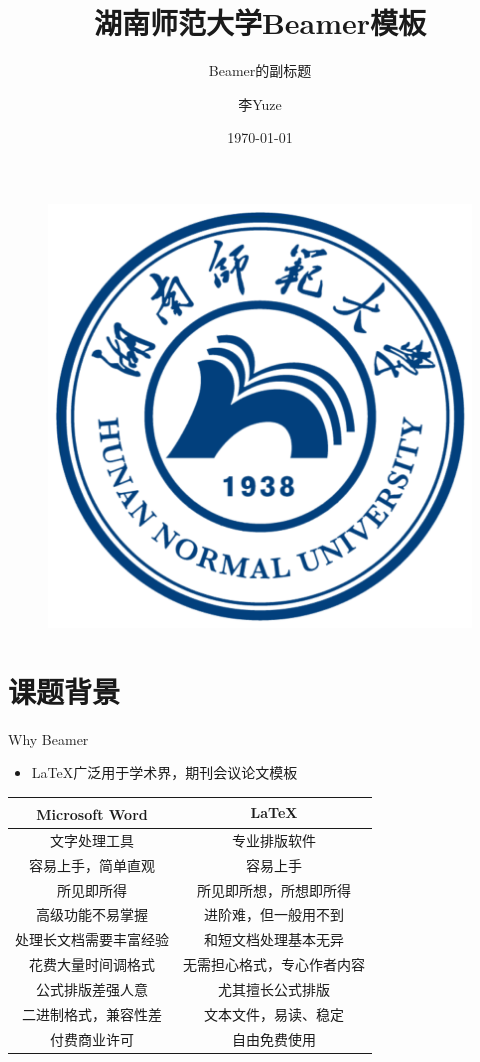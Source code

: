 \documentclass{beamer}
\author[LIYUZE]{李Yuze}
\title{湖南师范大学\textrm{Beamer}模板}
\subtitle{\textrm{Beamer的副标题}}
\institute{湖南师范大学数学与统计学院}
\date{\today}
\begin{document}
\kaishu
\begin{frame}
    \titlepage
    \begin{figure}[htpb]
       \begin{center}
            \includegraphics[width=0.2\linewidth]{pic/hunnu_logo.png}
        \end{center}
    \end{figure}
\end{frame}

\begin{frame}
    \tableofcontents[sectionstyle=show,subsectionstyle=show/shaded/hide,subsubsectionstyle=show/shaded/hide]
\end{frame}


\section{课题背景}

\begin{frame}{Why Beamer}
	\begin{itemize}
		\item \LaTeX 广泛用于学术界，期刊会议论文模板
	\end{itemize}
	\begin{table}[h]
		\centering
		\begin{tabular}{c|c}
			Microsoft\textsuperscript{\textregistered}  Word & \LaTeX \\
			\hline
			文字处理工具 & 专业排版软件 \\
			容易上手，简单直观 & 容易上手 \\
			所见即所得 & 所见即所想，所想即所得 \\
			高级功能不易掌握 & 进阶难，但一般用不到 \\
			处理长文档需要丰富经验 & 和短文档处理基本无异 \\
			花费大量时间调格式 & 无需担心格式，专心作者内容 \\
			公式排版差强人意 & 尤其擅长公式排版 \\
			二进制格式，兼容性差 & 文本文件，易读、稳定 \\
			付费商业许可 & 自由免费使用 \\
		\end{tabular}
	\end{table}
\end{frame}
\end{document}

